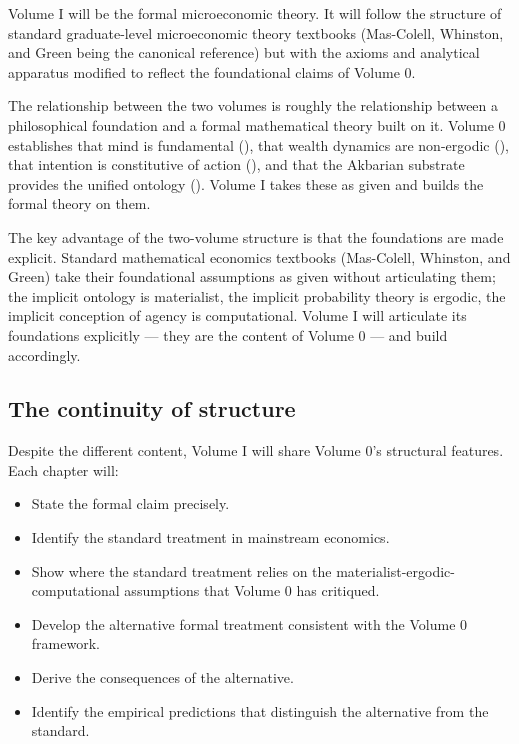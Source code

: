 Volume I will be the formal microeconomic theory. It will follow
the structure of standard graduate-level microeconomic theory
textbooks (Mas-Colell, Whinston, and Green being the canonical
reference) but with the axioms and analytical apparatus modified
to reflect the foundational claims of Volume 0.

The relationship between the two volumes is roughly the relationship
between a philosophical foundation and a formal mathematical
theory built on it. Volume 0 establishes that mind is fundamental
(), that wealth dynamics are
non-ergodic (), that intention is constitutive
of action (), and that the Akbarian
substrate provides the unified ontology ().
Volume I takes these as given and builds the formal theory on
them.

The key advantage of the two-volume structure is that the
foundations are made explicit. Standard mathematical economics
textbooks (Mas-Colell, Whinston, and Green) take their
foundational assumptions as given without articulating them; the
implicit ontology is materialist, the implicit probability theory
is ergodic, the implicit conception of agency is computational.
Volume I will articulate its foundations explicitly --- they are
the content of Volume 0 --- and build accordingly.

\subsection{The continuity of structure}

Despite the different content, Volume I will share Volume 0's
structural features. Each chapter will:

\begin{itemize}[leftmargin=2em]
    \item State the formal claim precisely.
    \item Identify the standard treatment in mainstream
    economics.
    \item Show where the standard treatment relies on the
    materialist-ergodic-computational assumptions that Volume 0
    has critiqued.
    \item Develop the alternative formal treatment consistent
    with the Volume 0 framework.
    \item Derive the consequences of the alternative.
    \item Identify the empirical predictions that distinguish
    the alternative from the standard.
\end{itemize}

